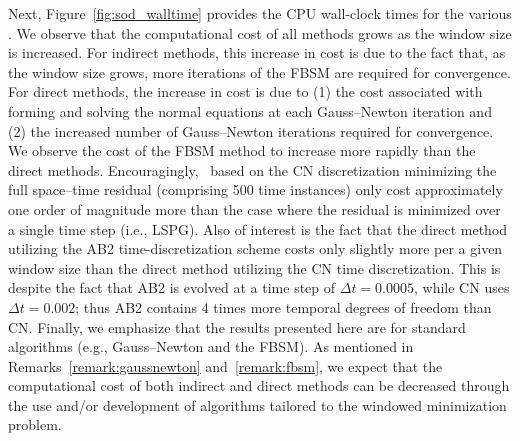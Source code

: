 Next, Figure~\ref{fig:sod_walltime} provides the CPU wall-clock times for the various \methodAcronymROMs. We observe that the computational cost of all methods grows
as the window size is increased. For indirect methods, this increase in cost is due to the fact that, as the window size 
grows, more iterations of the FBSM are required for convergence. For direct methods, the increase in cost is due to (1) the cost 
associated with forming and solving the normal equations at each Gauss--Newton iteration and (2) the increased number of 
Gauss--Newton iterations required for convergence. We observe the cost of the FBSM method to increase more rapidly 
than the direct methods. Encouragingly, \methodAcronymROMs\ based on the CN discretization
minimizing the full space--time residual (comprising 
500 time instances) only  
cost approximately one order of magnitude more than the case where the residual is minimized over a single time step (i.e., LSPG). Also of interest is the 
fact that the direct method utilizing the AB2 time-discretization scheme costs only slightly more per a given window size than the direct method 
utilizing the CN time discretization. This is despite the fact that AB2 is evolved at a time step of $\Delta t = 0.0005$, while CN uses $\Delta t = 0.002$; thus 
AB2 contains 4 times more temporal degrees of freedom than CN.  Finally, we emphasize that the 
results presented here are for standard algorithms (e.g., Gauss--Newton and the FBSM). As mentioned in 
Remarks~\ref{remark:gaussnewton} and~\ref{remark:fbsm}, we expect that the computational cost 
of both indirect and direct methods can be decreased through the use and/or development of 
algorithms tailored to the windowed minimization problem. 


